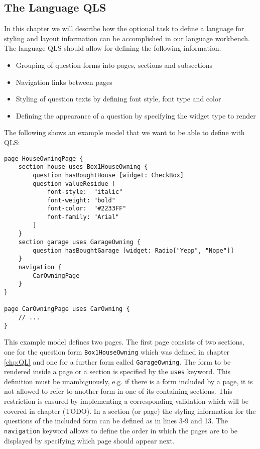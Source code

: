 \subsection{The Language QLS}

In this chapter we will describe how the optional task to define a language 
for styling and layout information can be accomplished in our language workbench.
The language QLS should allow for defining the following information:
\begin{itemize}
  \item Grouping of question forms into pages, sections and subsections
  \item Navigation links between pages
  \item Styling of question texts by defining font style, font type and color
  \item Defining the appearance of a question by specifying the widget type to render
\end{itemize}

The following shows an example model that we want to be able to define with QLS:

\begin{lstlisting}[language=QLS]
page HouseOwningPage {
	section house uses Box1HouseOwning {
		question hasBoughtHouse [widget: CheckBox]
		question valueResidue [
			font-style:  "italic"
			font-weight: "bold" 
			font-color:  "#2233FF"
			font-family: "Arial"
		]
	}
	section garage uses GarageOwning {
		question hasBoughtGarage [widget: Radio["Yepp", "Nope"]]		
	}
	navigation {
		CarOwningPage
	}
}

page CarOwningPage uses CarOwning {
	// ...
}
\end{lstlisting}

This example model defines two pages. The first page consists of two sections,
one for the question form \texttt{Box1HouseOwning} which was defined in chapter 
\ref{chp:QL} and one for a further form called \texttt{GarageOwning}. The form to
be rendered inside a page or a section is specified by the \texttt{uses} keyword.
This definition must be unambiguously, e.g. if there is a form included by a page,
it is not allowed to refer to another form in one of its containing sections.
This restriction is ensured by implementing a corresponding validation which will be covered
in chapter (TODO). In a section (or page) the styling information for the questions of the included
form can be defined as in lines 3-9 and 13. The \texttt{navigation} keyword allows to define the order in which the pages are to
be displayed by specifying which page should appear next.

